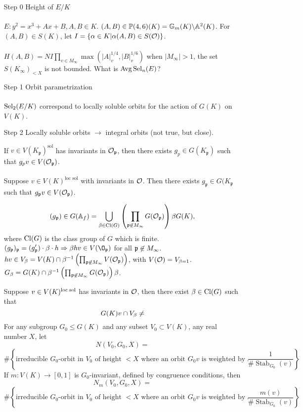 \documentclass[12pt,amsfont]{amsart}
\begin{document}
\begin{itemize}
\item[Step 0]
Height of $E/K$ \\ \\
$E: y^2 = x^3 + Ax + B, A,B \in K$. $(A,B) \in \mathbb{P}(4,6)(K) = \mathbb{G}_m(K) \backslash \mathbb{A}^2(K)$. For $(A,B) \in S(K)$, let $I = \{\alpha \in K | \alpha (A,B) \in S(\mathcal{O})\}$.  \\ \\
$H(A,B) = NI \prod_{v \in M_\infty} \max(|A|_v^{1/4}, |B|_v^{1/6})$ when $|M_\infty| > 1$, the set $S(K_\infty)_{< X}$ is not bounded. What is $\operatorname{Avg} \operatorname{Sel}_n(E)$? 

\item[Step 1] Orbit parametrization \\ \\
$\operatorname{Sel}_2(E/K)$ correspond to locally soluble orbits for the action of $G(K)$ on $V(K)$. 

\item[Step 2] Locally soluble orbits $\rightarrow$ integral orbits (not true, but close). 

\begin{lem} If $v \in V(K_{\mathfrak{p}})^{\text{sol}}$ has invariants in $\mathcal{O}_{\mathfrak{p}}$, then there exists $g_p \in G(K_{\mathfrak{p}})$ such that $g_p v \in V(\mathcal{O}_{\mathfrak{p}})$. \\ \\
Suppose $v \in V(K)^{\text{loc sol}}$ with invariants in $\mathcal{O}$. Then there exists $g_{\mathfrak{p}} \in G(K_{\mathfrak{p}}$ such that $g_{\mathfrak{p}} v \in V(\mathcal{O}_{\mathfrak{p}})$. 
\end{lem}
\[
(g_{\mathfrak{p}}) \in G(\mathbb{A}_f) = \bigcup_{\beta \in \operatorname{Cl}(G)} \left(\prod_{\mathfrak{p} \not \in M_\infty} G(\mathcal{O}_{\mathfrak{p}}) \right) \beta G(K),
\]
where $\operatorname{Cl}(G)$ is the class group of $G$ which is finite. 
$\displaystyle (g_\fp)_\fp = (g_\fp') \cdot \beta \cdot h \Rightarrow \beta h v \in V(\O_\fp)$ for all $\mathfrak{p} \not \in M_\infty$. 
$hv \in V_\beta = V(K) \cap \beta^{-1} \left(\prod_{\mathfrak{p} \not \in M_\infty} V(\mathcal{O}_{\mathfrak{p}})\right)$, with $V(\mathcal{O}) = V_{\beta = 1}$. \\
$G_\beta = G(K) \cap \beta^{-1} \left(\prod_{\mathfrak{p} \not \in M_\infty} G(\mathcal{O}_{\mathfrak{p}})\right)\beta$. 

\begin{pro} Suppose $v \in V(K)^{\text{loc\;sol}}$ has invariants in $\mathcal{O}$, then there exist $\beta \in \operatorname{Cl}(G)$ such that
\[G(K) v \cap V_\beta \ne \empty\]
For any subgroup $G_0 \leq G(K)$ and any subset $V_0 \subset V(K)$, any real number $X$, let 
\[N(V_0, G_0, X) =\]
\[ \# \left\{ \text{irreducible } G_0 \text{-orbit in } V_0 \text{ of height } < X \text{ where an orbit } G_0 v \text{ is weighted by } \frac{1}{\# \operatorname{Stab}_{G_0}(v)} \right \}. \]
If $m : V(K) \rightarrow [0,1]$ is $G_0$-invariant, defined by congruence conditions, then 
\[N_m(V_0, G_0, X) = \]
\[ \# \left\{ \text{irreducible } G_0 \text{-orbit in } V_0 \text{ of height } < X \text{ where an orbit } G_0 v \text{ is weighted by } \frac{m(v)}{\# \operatorname{Stab}_{G_0}(v)} \right \}. \]
\end{pro} 


\end{itemize}
\end{document}
